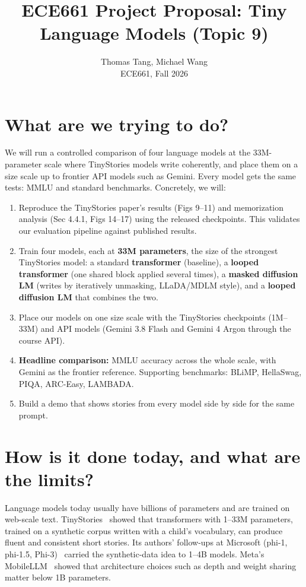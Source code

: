 \documentclass[11pt]{article}
\title{ECE661 Project Proposal: Tiny Language Models (Topic 9)}
\author{Thomas Tang, Michael Wang \\ ECE661, Fall 2026}
\date{}
\begin{document}
\maketitle

\section{What are we trying to do?}

We will run a controlled comparison of four language models at the 33M-parameter scale where TinyStories models write coherently, and place them on a size scale up to frontier API models such as Gemini. Every model gets the same tests: MMLU and standard benchmarks. Concretely, we will:

\begin{enumerate}
  \item Reproduce the TinyStories paper's results (Figs 9--11) and memorization analysis (Sec 4.4.1, Figs 14--17) using the released checkpoints. This validates our evaluation pipeline against published results.
  \item Train four models, each at \textbf{33M parameters}, the size of the strongest TinyStories model: a standard \textbf{transformer} (baseline), a \textbf{looped transformer} (one shared block applied several times), a \textbf{masked diffusion LM} (writes by iteratively unmasking, LLaDA/MDLM style), and a \textbf{looped diffusion LM} that combines the two.
  \item Place our models on one size scale with the TinyStories checkpoints (1M--33M) and API models (Gemini 3.8 Flash and Gemini 4 Argon through the course API).
  \item \textbf{Headline comparison:} MMLU accuracy across the whole scale, with Gemini as the frontier reference. Supporting benchmarks: BLiMP, HellaSwag, PIQA, ARC-Easy, LAMBADA.
  \item Build a demo that shows stories from every model side by side for the same prompt.
\end{enumerate}

\section{How is it done today, and what are the limits?}

Language models today usually have billions of parameters and are trained on web-scale text. TinyStories~\cite{tinystories} showed that transformers with 1--33M parameters, trained on a synthetic corpus written with a child's vocabulary, can produce fluent and consistent short stories. Its authors' follow-ups at Microsoft (phi-1, phi-1.5, Phi-3)~\cite{phi1} carried the synthetic-data idea to 1--4B models. Meta's MobileLLM~\cite{mobilellm} showed that architecture choices such as depth and weight sharing matter below 1B parameters.
\end{document}
